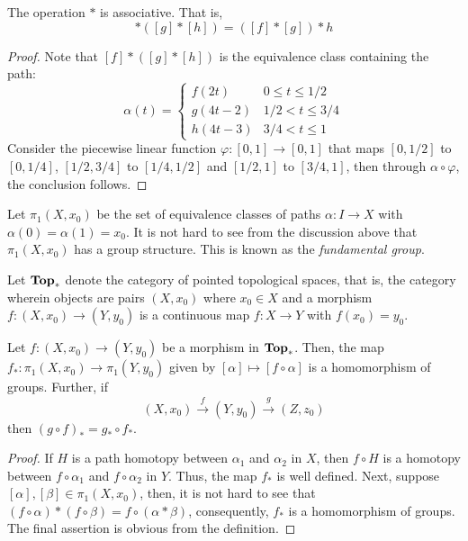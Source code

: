 \begin{proposition}
    The operation $*$ is associative. That is, 
    \begin{equation*}
        [f]*([g]*[h]) = ([f]*[g])*h
    \end{equation*}
\end{proposition}
\begin{proof}
    Note that $[f]*([g]*[h])$ is the equivalence class containing the path: 
    \begin{equation*}
        \alpha(t) = 
        \begin{cases}
            f(2t) & 0\le t\le 1/2\\
            g(4t - 2) & 1/2 < t\le 3/4\\
            h(4t - 3) & 3/4 < t\le 1
        \end{cases}
    \end{equation*}
    Consider the piecewise linear function $\varphi: [0,1]\to[0,1]$ that maps $[0,1/2]$ to $[0,1/4]$, $[1/2,3/4]$ to $[1/4,1/2]$ and $[1/2,1]$ to $[3/4,1]$, then through $\alpha\circ\varphi$, the conclusion follows.
\end{proof}

\begin{definition}
    Let $\pi_1(X,x_0)$ be the set of equivalence classes of paths $\alpha: I\to X$ with $\alpha(0) = \alpha(1) = x_0$. It is not hard to see from the discussion above that $\pi_1(X,x_0)$ has a group structure. This is known as the \textit{fundamental group}.
\end{definition}

Let $\mathbf{Top}_*$ denote the category of pointed topological spaces, that is, the category wherein objects are pairs $(X,x_0)$ where $x_0\in X$ and a morphism $f:(X,x_0)\to (Y,y_0)$ is a continuous map $f: X\to Y$ with $f(x_0) = y_0$.

\begin{proposition}
    Let $f: (X,x_0)\to (Y,y_0)$ be a morphism in $\mathbf{Top}_*$. Then, the map $f_*:\pi_1(X,x_0)\to\pi_1(Y,y_0)$ given by $[\alpha]\mapsto[f\circ\alpha]$ is a homomorphism of groups. Further, if 
    \begin{equation*}
        (X,x_0)\stackrel{f}{\longrightarrow}(Y,y_0)\stackrel{g}{\longrightarrow}(Z,z_0)
    \end{equation*}
    then $(g\circ f)_* = g_*\circ f_*$.
\end{proposition}
\begin{proof}
    If $H$ is a path homotopy between $\alpha_1$ and $\alpha_2$ in $X$, then $f\circ H$ is a homotopy between $f\circ\alpha_1$ and $f\circ\alpha_2$ in $Y$. Thus, the map $f_*$ is well defined. Next, suppose $[\alpha],[\beta]\in\pi_1(X,x_0)$, then, it is not hard to see that $(f\circ\alpha)*(f\circ\beta) = f\circ(\alpha * \beta)$, consequently, $f_*$ is a homomorphism of groups. The final assertion is obvious from the definition.
\end{proof}

